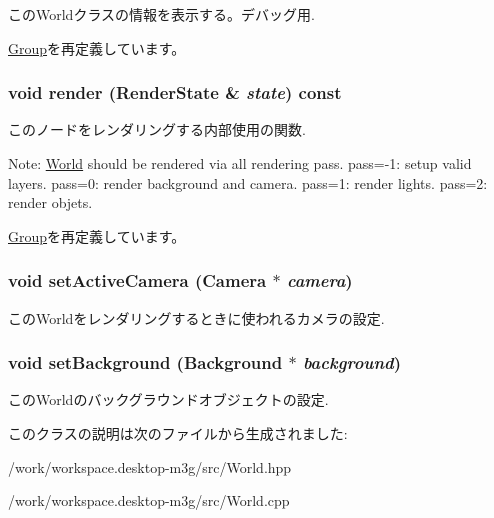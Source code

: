 このWorldクラスの情報を表示する。デバッグ用. 

\hyperlink{classm3g_1_1Group_6fea17fa1532df3794f8cb39cb4f911f}{Group}を再定義しています。\hypertarget{classm3g_1_1World_8babc8a79b78615da51161e94029eea9}{
\subsubsection[{render}]{\setlength{\rightskip}{0pt plus 5cm}void render ({\bf RenderState} \& {\em state}) const}}
\label{classm3g_1_1World_8babc8a79b78615da51161e94029eea9}


このノードをレンダリングする内部使用の関数.

Note: \hyperlink{classm3g_1_1World}{World} should be rendered via all rendering pass. pass=-1: setup valid layers. pass=0: render background and camera. pass=1: render lights. pass=2: render objets. 

\hyperlink{classm3g_1_1Group_8babc8a79b78615da51161e94029eea9}{Group}を再定義しています。\hypertarget{classm3g_1_1World_dd9a82b335e8521592ad410c662a5cfd}{
\subsubsection[{setActiveCamera}]{\setlength{\rightskip}{0pt plus 5cm}void setActiveCamera ({\bf Camera} $\ast$ {\em camera})}}
\label{classm3g_1_1World_dd9a82b335e8521592ad410c662a5cfd}


このWorldをレンダリングするときに使われるカメラの設定. \hypertarget{classm3g_1_1World_6193765c76d6dc0450f264918ebe7e1c}{
\subsubsection[{setBackground}]{\setlength{\rightskip}{0pt plus 5cm}void setBackground ({\bf Background} $\ast$ {\em background})}}
\label{classm3g_1_1World_6193765c76d6dc0450f264918ebe7e1c}


このWorldのバックグラウンドオブジェクトの設定. 

このクラスの説明は次のファイルから生成されました:\begin{CompactItemize}
\item 
/work/workspace.desktop-m3g/src/World.hpp\item 
/work/workspace.desktop-m3g/src/World.cpp\end{CompactItemize}
